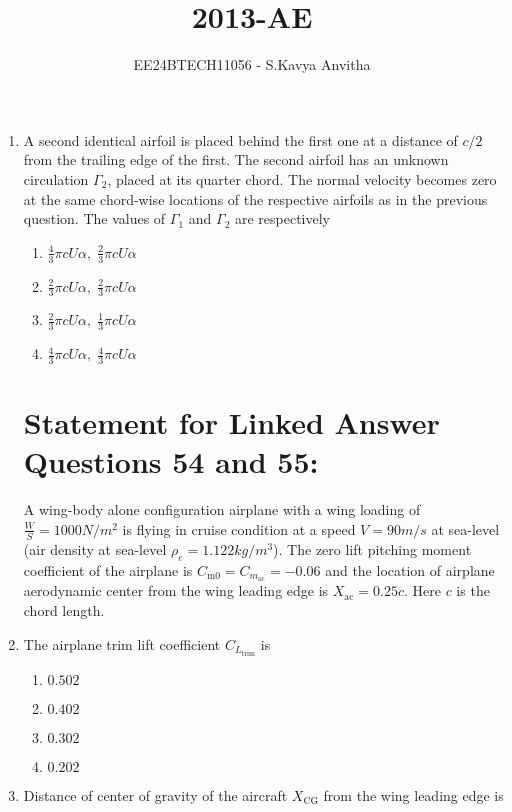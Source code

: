 \documentclass[journal]{IEEEtran}
\begin{document}

\vspace{3cm}

\title{2013-AE}
\author{EE24BTECH11056 - S.Kavya Anvitha}
\maketitle
\bigskip

\renewcommand{\thefigure}{\theenumi}
\renewcommand{\thetable}{\theenumi}
\begin{enumerate}

\item A second identical airfoil is placed behind the first one at a distance of $c/2$ from the trailing edge of the first. The second airfoil has an unknown circulation $\Gamma_2$, placed at its quarter chord. The normal velocity becomes zero at the same chord-wise locations of the respective airfoils as in the previous question. The values of $\Gamma_1$ and $\Gamma_2$ are respectively

\begin{enumerate}
    \item $\frac{4}{3} \pi c U \alpha, \; \frac{2}{3} \pi c U \alpha$
    \item $\frac{2}{3} \pi c U \alpha, \; \frac{2}{3} \pi c U \alpha$
    \item $\frac{2}{3} \pi c U \alpha, \; \frac{1}{3} \pi c U \alpha$
    \item $\frac{4}{3} \pi c U \alpha, \; \frac{4}{3} \pi c U \alpha$\\
\end{enumerate}
\section{Statement for Linked Answer Questions 54 and 55:} A wing-body alone configuration airplane with a wing loading of $\frac{W}{S} = 1000N/m^2$ is flying in cruise condition at a speed $V = 90m/s$ at sea-level (air density at sea-level $\rho_e = 1.122kg/m^3$). The zero lift pitching moment coefficient of the airplane is $C_{\text{m0}} = C_{m_{\text{ac}}} = -0.06$ and the location of airplane aerodynamic center from the wing leading edge is $X_{\text{ac}} = 0.25c$. Here $c$ is the chord length.
\item The airplane trim lift coefficient $C_{L_{\text{trim}}}$ is

\begin{enumerate}
    \item $0.502$
    \item $0.402$
    \item $0.302$
    \item $0.202$\\
\end{enumerate}
\item Distance of center of gravity of the aircraft $X_{\text{CG}}$ from the wing leading edge is


\end{enumerate}
\end{document}
